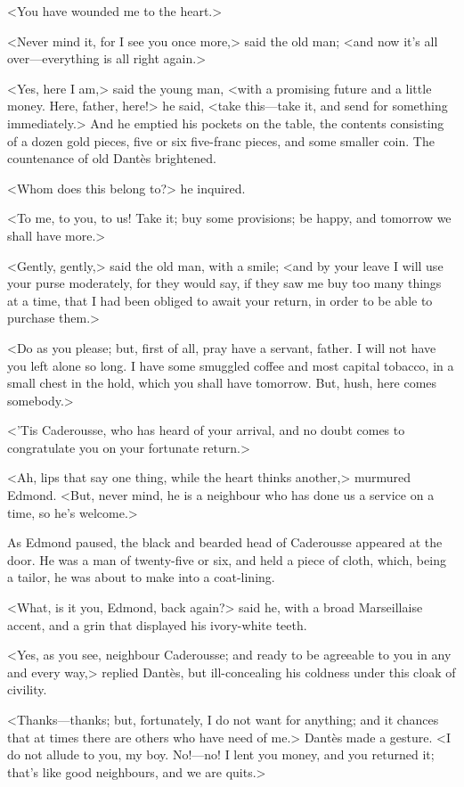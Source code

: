  <You have wounded me to the heart.> 

 <Never mind it, for I see you once more,> said the old man; <and now it's all over—everything is all right again.>  
 
 <Yes, here I am,> said the young man, <with a promising future and a little money. Here, father, here!> he said, <take this—take it, and send for something immediately.> And he emptied his pockets on the table, the contents consisting of a dozen gold pieces, five or six five-franc pieces, and some smaller coin. The countenance of old Dantès brightened. 

 <Whom does this belong to?> he inquired. 

 <To me, to you, to us! Take it; buy some provisions; be happy, and tomorrow we shall have more.> 

 <Gently, gently,> said the old man, with a smile; <and by your leave I will use your purse moderately, for they would say, if they saw me buy too many things at a time, that I had been obliged to await your return, in order to be able to purchase them.> 

 <Do as you please; but, first of all, pray have a servant, father. I will not have you left alone so long. I have some smuggled coffee and most capital tobacco, in a small chest in the hold, which you shall have tomorrow. But, hush, here comes somebody.> 

 <'Tis Caderousse, who has heard of your arrival, and no doubt comes to congratulate you on your fortunate return.> 

 <Ah, lips that say one thing, while the heart thinks another,> murmured Edmond. <But, never mind, he is a neighbour who has done us a service on a time, so he's welcome.> 

 As Edmond paused, the black and bearded head of Caderousse appeared at the door. He was a man of twenty-five or six, and held a piece of cloth, which, being a tailor, he was about to make into a coat-lining. 

 <What, is it you, Edmond, back again?> said he, with a broad Marseillaise accent, and a grin that displayed his ivory-white teeth. 

 <Yes, as you see, neighbour Caderousse; and ready to be agreeable to you in any and every way,> replied Dantès, but ill-concealing his coldness under this cloak of civility. 

 <Thanks—thanks; but, fortunately, I do not want for anything; and it chances that at times there are others who have need of me.> Dantès made a gesture. <I do not allude to you, my boy. No!—no! I lent you money, and you returned it; that's like good neighbours, and we are quits.> 

